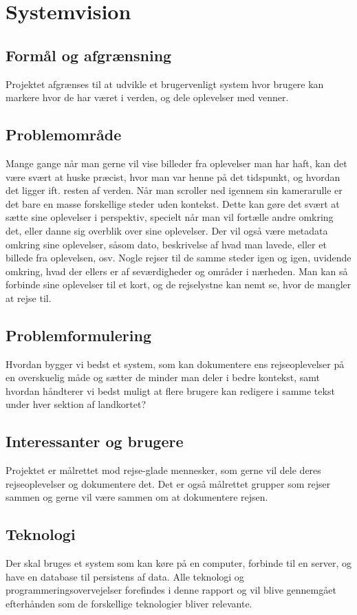 \chapter{Systemvision}\label{ch:systemvision}

\section{Formål og afgrænsning}\label{sec:purpose}
Projektet afgrænses til at udvikle et brugervenligt system hvor brugere kan markere hvor de har været i verden, og dele oplevelser med venner.

\section{Problemområde}\label{sec:problemarea}
Mange gange når man gerne vil vise billeder fra oplevelser man har haft, kan det være svært at huske præcist, hvor man var henne på det tidspunkt, og hvordan det ligger ift. resten af verden. Når man scroller ned igennem sin kamerarulle er det bare en masse forskellige steder uden kontekst. Dette kan gøre det svært at sætte sine oplevelser i perspektiv, specielt når man vil fortælle andre omkring det, eller danne sig overblik over sine oplevelser. Der vil også være metadata omkring sine oplevelser, såsom dato, beskrivelse af hvad man lavede, eller et billede fra oplevelsen, osv. Nogle rejser til de samme steder igen og igen, uvidende omkring, hvad der ellers er af seværdigheder og områder i nærheden. Man kan så forbinde sine oplevelser til et kort, og de rejselystne kan nemt se, hvor de mangler at rejse til.

\section{Problemformulering}\label{sec:problemstatement}
Hvordan bygger vi bedst et system, som kan dokumentere ens rejseoplevelser på en overskuelig måde og sætter de minder man deler i bedre kontekst, samt hvordan håndterer vi bedst muligt at flere brugere kan redigere i samme tekst under hver sektion af landkortet?

\section{Interessanter og brugere}\label{sec:users}
Projektet er målrettet mod rejse-glade mennesker, som gerne vil dele deres rejseoplevelser og dokumentere det. Det er også målrettet grupper som rejser sammen og gerne vil være sammen om at dokumentere rejsen.

\section{Teknologi}\label{sec:technology}
Der skal bruges et system som kan køre på en computer, forbinde til en server, og have en database til persistens af data.
Alle teknologi og programmeringsovervejelser forefindes i denne rapport og vil blive gennemgået efterhånden som de forskellige teknologier bliver relevante.